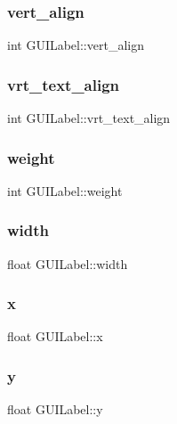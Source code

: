 \hypertarget{class_g_u_i_label_a1f513ff1bc769d493267ec35ed5e223d}{}\label{class_g_u_i_label_a1f513ff1bc769d493267ec35ed5e223d} 
\subsubsection{\texorpdfstring{vert\+\_\+align}{vert\_align}}
{\footnotesize\ttfamily int G\+U\+I\+Label\+::vert\+\_\+align}

\hypertarget{class_g_u_i_label_a6449baf6ce57a36024aa75c431d3635b}{}\label{class_g_u_i_label_a6449baf6ce57a36024aa75c431d3635b} 
\subsubsection{\texorpdfstring{vrt\+\_\+text\+\_\+align}{vrt\_text\_align}}
{\footnotesize\ttfamily int G\+U\+I\+Label\+::vrt\+\_\+text\+\_\+align}

\hypertarget{class_g_u_i_label_aeadec1e62fb3cd882cdd4f64325832f2}{}\label{class_g_u_i_label_aeadec1e62fb3cd882cdd4f64325832f2} 
\subsubsection{\texorpdfstring{weight}{weight}}
{\footnotesize\ttfamily int G\+U\+I\+Label\+::weight}

\hypertarget{class_g_u_i_label_ad58a256270487667d8d928332f5467fb}{}\label{class_g_u_i_label_ad58a256270487667d8d928332f5467fb} 
\subsubsection{\texorpdfstring{width}{width}}
{\footnotesize\ttfamily float G\+U\+I\+Label\+::width}

\hypertarget{class_g_u_i_label_afc04a00a1336cec1bb6a94f62443e51b}{}\label{class_g_u_i_label_afc04a00a1336cec1bb6a94f62443e51b} 
\subsubsection{\texorpdfstring{x}{x}}
{\footnotesize\ttfamily float G\+U\+I\+Label\+::x}

\hypertarget{class_g_u_i_label_aa302d2303602c024f203dda2ac6de0d9}{}\label{class_g_u_i_label_aa302d2303602c024f203dda2ac6de0d9} 
\subsubsection{\texorpdfstring{y}{y}}
{\footnotesize\ttfamily float G\+U\+I\+Label\+::y}

